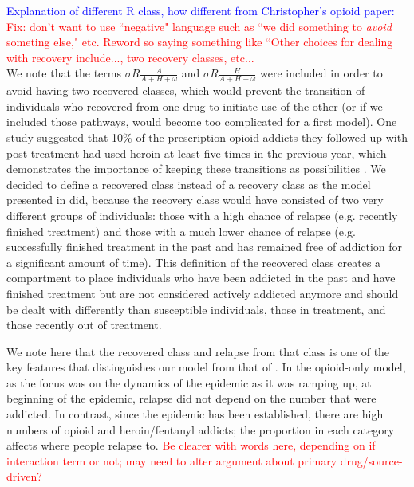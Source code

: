\documentclass[12pt]{article}
\begin{document}
\textcolor{blue}{Explanation of different R class, how different from Christopher's opioid paper:} \\
\textcolor{red}{Fix: don't want to use ``negative" language such as ``we did something to \textit{avoid} someting else," etc. Reword so saying something like ``Other choices for dealing with recovery include..., two recovery classes, etc...} \\
We note that the terms $\sigma R \frac{A}{A+H+\omega}$ and $\sigma R \frac{H}{A+H+\omega}$ were included in order to avoid having two recovered classes, which would prevent the transition of individuals who recovered from one drug to initiate use of the other (or if we included those pathways, would become too complicated for a first model). One study suggested that 10\% of the prescription opioid addicts they followed up with post-treatment had used heroin at least five times in the previous year, which demonstrates the importance of keeping these transitions as possibilities \cite{Weiss}. We decided to define a recovered class instead of a recovery class as the model presented in \cite{Battista} did, because the recovery class would have consisted of two very different groups of individuals: those with a high chance of relapse (e.g. recently finished treatment) and those with a much lower chance of relapse (e.g. successfully finished treatment in the past and has remained free of addiction for a significant amount of time). This definition of the recovered class creates a compartment to place individuals who have been addicted in the past and have finished treatment but are not considered actively addicted anymore and should be dealt with differently than susceptible individuals, those in treatment, and those recently out of treatment. %

We note here that the recovered class and relapse from that class is one of the key features that distinguishes our model from that of \cite{Battista}. In the opioid-only model, as the focus was on the dynamics of the epidemic as it was ramping up, at beginning of the epidemic, relapse did not depend on the number that were addicted. In contrast, since the epidemic has been established, there are high numbers of opioid and heroin/fentanyl addicts; the proportion in each category affects where people relapse to. \textcolor{red}{Be clearer with words here, depending on if interaction term or not; may need to alter argument about primary drug/source-driven?} 
\end{document}
